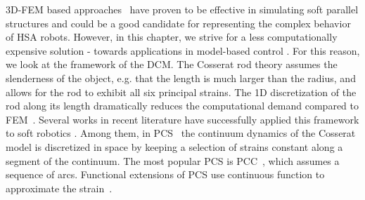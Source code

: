 3D-\gls{FEM} based approaches~\cite{farrell2020extension} have proven to be effective in simulating soft parallel structures \cite{vanneste2021enabling} and could be a good candidate for representing the complex behavior of \gls{HSA} robots. However, in this chapter, we strive for a less computationally expensive solution - towards applications in model-based control \cite{della2023model}. For this reason, we look at the framework of the \gls{DCM}. The Cosserat rod theory assumes the slenderness of the object, e.g. that the length is much larger than the radius, and allows for the rod to exhibit all six principal strains. The 1D discretization of the rod along its length dramatically reduces the computational demand compared to \gls{FEM}~\cite{gazzola2018forward}. 
%
Several works in recent literature have successfully applied this framework to soft robotics \cite{grazioso2019geometrically,sadati2021tmtdyn,armanini2023soft}. Among them, in \gls{PCS}~\cite{renda2018discrete} the continuum dynamics of the Cosserat model is discretized in space by keeping a selection of strains constant along a segment of the continuum. %
The most popular \gls{PCS} is \gls{PCC}~\cite{webster2010design}, which assumes a sequence of arcs. Functional extensions of \gls{PCS} use continuous function to approximate the strain~\cite{della2019control,renda2020geometric}. %


